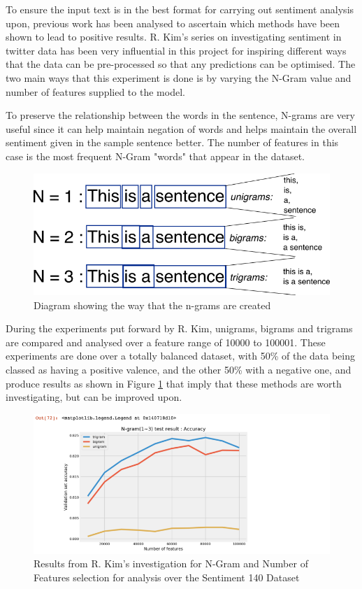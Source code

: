 To ensure the input text is in the best format for carrying out sentiment analysis upon, previous work has been analysed to ascertain which methods have been shown to lead to positive results.
R. Kim's series on investigating sentiment in twitter data \cite{towardsDS} has been very influential in this project for inspiring different ways that the data can be pre-processed so that any predictions can be optimised.
The two main ways that this experiment is done is by varying the N-Gram value and number of features supplied to the model.

To preserve the relationship between the words in the sentence, N-grams are very useful since it can help maintain negation of words and helps maintain the overall sentiment given in the sample sentence better. The number of features in this case is the most frequent N-Gram "words" that appear in the dataset.

\begin{figure}[h]
\centering
\includegraphics[scale=0.5]{litImgs/ngrams.png}
\caption{Diagram showing the way that the n-grams are created}
\end{figure}


During the experiments put forward by R. Kim, unigrams, bigrams and trigrams are compared and analysed over a feature range of 10000 to 100001. These experiments are done over a totally balanced dataset, with 50\% of the data being classed as having a positive valence, and the other 50\% with a negative one, and produce results as shown in Figure \ref{towards:DS} that imply that these methods are worth investigating, but can be improved upon.

\begin{figure}[h]
\centering
\includegraphics[scale=0.5]{litImgs/towardsDSNgramNFeatures.png}
\caption{Results from R. Kim's investigation for N-Gram and Number of Features selection for analysis over the Sentiment 140 Dataset \cite{go2016sentiment140}}
\label{towards:DS}
\end{figure}

